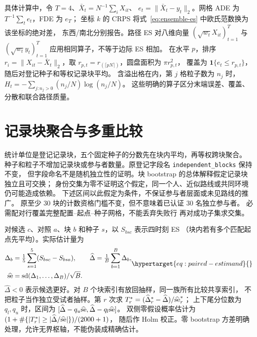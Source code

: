 具体计算中，令 \(T=4\)、\(\bar X_t=N^{-1}\sum_iX_{it}\)、
\(e_t=\|\bar X_t-y_t\|_2\)。网格 ADE 为 \(T^{-1}\sum_t e_t\)，FDE 为 \(e_T\)；
坐标 \(k\) 的 CRPS 将式~\eqref{eq:ensemble-es} 中欧氏范数换为该坐标的绝对差，
东西/南北分别报告。路径 ES 对八维向量
\((\sqrt{w_t}X_{it})_{t=1}^T\) 与 \((\sqrt{w_t}y_t)_{t=1}^T\)
应用相同算子，不等于边际 ES 相加。
在水平 \(p\)，排序 \(r_i=\|X_{it}-\bar X_t\|_2\)，取
\(r_{p,t}=r_{(\lceil pN\rceil)}\)，圆盘面积为 \(\pi r_{p,t}^2\)，
覆盖为 \(\mathbf1\{e_t\leq r_{p,t}\}\)，随后对登记种子和等权记录块平均。
含溢出格在内，第 \(j\) 格粒子数为 \(n_j\) 时，
\(H_t=-\sum_{j:n_j>0}(n_j/N)\log(n_j/N)\)。
这些明确的算子区分末端误差、覆盖、分散和联合路径质量。


\section{记录块聚合与多重比较}
统计单位是登记记录块，五个固定种子的分数先在块内平均，再等权跨块聚合。
种子和粒子不增加记录块或参与者数量。原登记字段名 \texttt{independent\_blocks} 保持不变，
但字段命名不是随机独立性的证明。块 bootstrap 的总体解释假定记录块独立且可交换；
身份交集为零不证明这个假定，同一个人、近似路线或共同环境仍可能造成依赖。
下述区间以此假定为条件，不保证参与者层面或未见路线的推广。
原至少 30 块的计数资格门槛不变，但不意味着已认证 30 名独立参与者。
必需配对行覆盖完整配置--起点--种子网格，不能丢弃失败行
再对成功子集求交集。

对候选 \(c\)、对照 \(a\)、块 \(b\) 和种子 \(s\)，以 \(S_{bsc}\) 表示四时刻 ES
（块内若有多个匹配起点先平均）。实际估计量为
\begin{equation}
\begin{aligned}
\Delta_b&=\tfrac15\sum_{s=1}^5(S_{bsc}-S_{bsa}),\qquad
\widehat\Delta=\tfrac1B\sum_{b=1}^B\Delta_b,\\
\widehat{\rm se}&={\rm sd}(\Delta_1,\ldots,\Delta_B)/\sqrt B.
\end{aligned}
\label{eq:paired-estimand}\hypertarget{eq:paired-estimand}{}
\end{equation}
\(\widehat\Delta<0\) 表示候选更好。对 \(B\) 个块索引有放回抽样，同一族所有比较共享索引，
不把粒子当作独立受试者抽样。第 \(r\) 次求
\(T_r^*=(\widehat\Delta_r^*-\widehat\Delta)/\widehat{\rm se}_r^*\)；
上下尾分位数为 \(q_l,q_u\) 时，区间为
\([\widehat\Delta-q_u\widehat{\rm se},\widehat\Delta-q_l\widehat{\rm se}]\)。
双侧零假设概率估计为
\((1+\#\{|T_r^*|\geq|\widehat\Delta/\widehat{\rm se}|\})/(2000+1)\)，
随后作 Holm 校正。零 bootstrap 方差明确处理，允许无界枢轴，不能伪装成精确估计。

